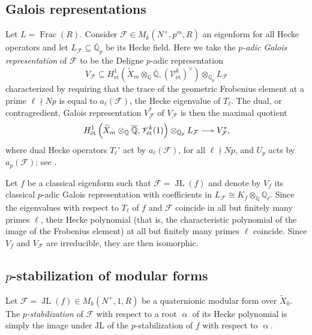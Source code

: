 \documentclass[a4paper]{amsart}
\numberwithin{equation}{section}
\theoremstyle{definition}
\newcommand{\Q}{\mathbb{Q}}
\DeclareMathOperator{\et}{\text{\'et}}
\renewcommand{\et}{\mathrm{\acute{e}t}}
\newcommand{\longepi}{\mbox{\;$\relbar\joinrel\twoheadrightarrow$\;}}
\begin{document}
\subsection{Galois representations}\label{subsec.GaloisRepresentations}
Let $L=\operatorname{Frac}(R)$. Consider $\mathcal{F}\in M_k(N^+,p^m,R)$ an eigenform for all Hecke operators and let $L_\mathcal{F}\subseteq\overline{\Q}_p$ be its Hecke field. Here we take the \textit{$p$-adic Galois representation} of $\mathcal{F}$ to be the Deligne $p$-adic representation \[V_\mathcal{F}\subseteq 
H^{1}_{\et}\left(\widetilde{X}_m\otimes_{\Q}\overline{\Q},(\mathscr{V}_{\et}^k)^\vee\right)\otimes_{\Q_p}L_\mathcal{F}\] characterized by requiring that the trace of the geometric Frobenius element at a prime $\ell\nmid Np$ is equal to $a_\ell(\mathcal{F})$, the Hecke eigenvalue of $T_\ell$. The dual, or contragredient, Galois representation $V_\mathcal{F}^*$ of $V_\mathcal{F}$ is then the maximal quotient  
\[H^{1}_{\et}\left(\widetilde{X}_m\otimes_{\Q}\overline{\Q},\mathscr{V}^{k}_{\et}(1)\right)\otimes_{\Q_p}L_\mathcal{F}\longepi
V_\mathcal{F}^*,\] 
where dual Hecke operators $T_\ell'$ act by $a_\ell(\mathcal{F})$, for all $\ell\nmid Np$, and $U_p$ acts by $a_p(\mathcal{F})$; see \cite[\S 2.8]{KingsLoefflerZerbes.ERL}. 

Let $f$ be a classical eigenform such that $\mathcal{F}=\operatorname{JL}(f)$ and denote by $V_f$ its classical $p$-adic Galois representation with coefficients in $L_\mathcal{F}\cong K_f\otimes_\Q\Q_\ell$. Since the eigenvalues with respect to $T_\ell$ of $f$ and $\mathcal{F}$ coincide in all but finitely many primes $\ell$, their Hecke polynomial (that is, the characteristic polynomial of the image of the Frobenius element) at all but finitely many primes $\ell$ coincide. Since $V_f$ and $V_\mathcal{F}$ are irreducible, they are then isomorphic.

\subsection{$p$-stabilization of modular forms}\label{subsec.Stabilization}

Let $\mathcal{F}=\operatorname{JL}(f)\in M_k(N^+,1,R)$ be a quaternionic modular form over $\widetilde{X}_0$. The \textit{$p$-stabilization} of $\mathcal{F}$ with respect to a root $\upalpha$ of its Hecke polynomial is simply the image under $\mathrm{JL}$ of the $p$-stabilization of $f$ with respect to $\upalpha$.
\end{document}
